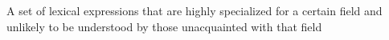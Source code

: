 A set of lexical expressions that are highly specialized for a certain field and unlikely to be understood by those unacquainted with that field
